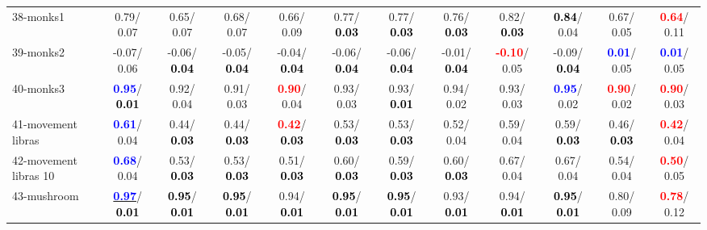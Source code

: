 \begin{table}[h]
\begin{center}
{\begin{tabular}{lc|c|c|c|c|c|c|c|c|c|c}
38-monks1 &   0.79/  0.07 &   0.65/  0.07 &   0.68/  0.07 &   0.66/  0.09 &   0.77/\textcolor{black}{\textbf{  0.03}} &   0.77/\textcolor{black}{\textbf{  0.03}} &   0.76/\textcolor{black}{\textbf{  0.03}} &   0.82/\textcolor{black}{\textbf{  0.03}} & \textcolor{black}{\textbf{  0.84}}/  0.04 &   0.67/  0.05 & \textcolor{red}{\textbf{  0.64}}/  0.11 \\
39-monks2 &  -0.07/  0.06 &  -0.06/\textcolor{black}{\textbf{  0.04}} &  -0.05/\textcolor{black}{\textbf{  0.04}} &  -0.04/\textcolor{black}{\textbf{  0.04}} &  -0.06/\textcolor{black}{\textbf{  0.04}} &  -0.06/\textcolor{black}{\textbf{  0.04}} &  -0.01/\textcolor{black}{\textbf{  0.04}} & \textcolor{red}{\textbf{ -0.10}}/  0.05 &  -0.09/\textcolor{black}{\textbf{  0.04}} & \textcolor{blue}{\textbf{  0.01}}/  0.05 & \textcolor{blue}{\textbf{  0.01}}/  0.05 \\ \hline
40-monks3 & \textcolor{blue}{\textbf{  0.95}}/\textcolor{black}{\textbf{  0.01}} &   0.92/  0.04 &   0.91/  0.03 & \textcolor{red}{\textbf{  0.90}}/  0.04 &   0.93/  0.03 &   0.93/\textcolor{black}{\textbf{  0.01}} &   0.94/  0.02 &   0.93/  0.03 & \textcolor{blue}{\textbf{  0.95}}/  0.02 & \textcolor{red}{\textbf{  0.90}}/  0.02 & \textcolor{red}{\textbf{  0.90}}/  0.03 \\
41-movement libras & \textcolor{blue}{\textbf{  0.61}}/  0.04 &   0.44/\textcolor{black}{\textbf{  0.03}} &   0.44/\textcolor{black}{\textbf{  0.03}} & \textcolor{red}{\textbf{  0.42}}/\textcolor{black}{\textbf{  0.03}} &   0.53/\textcolor{black}{\textbf{  0.03}} &   0.53/\textcolor{black}{\textbf{  0.03}} &   0.52/  0.04 &   0.59/  0.04 &   0.59/\textcolor{black}{\textbf{  0.03}} &   0.46/\textcolor{black}{\textbf{  0.03}} & \textcolor{red}{\textbf{  0.42}}/  0.04 \\
42-movement libras 10 & \textcolor{blue}{\textbf{  0.68}}/  0.04 &   0.53/\textcolor{black}{\textbf{  0.03}} &   0.53/\textcolor{black}{\textbf{  0.03}} &   0.51/\textcolor{black}{\textbf{  0.03}} &   0.60/\textcolor{black}{\textbf{  0.03}} &   0.59/\textcolor{black}{\textbf{  0.03}} &   0.60/\textcolor{black}{\textbf{  0.03}} &   0.67/  0.04 &   0.67/  0.04 &   0.54/  0.04 & \textcolor{red}{\textbf{  0.50}}/  0.05 \\
43-mushroom & \underline{\textcolor{blue}{\textbf{  0.97}}}/\textcolor{black}{\textbf{  0.01}} & \textcolor{black}{\textbf{  0.95}}/\textcolor{black}{\textbf{  0.01}} & \textcolor{black}{\textbf{  0.95}}/\textcolor{black}{\textbf{  0.01}} &   0.94/\textcolor{black}{\textbf{  0.01}} & \textcolor{black}{\textbf{  0.95}}/\textcolor{black}{\textbf{  0.01}} & \textcolor{black}{\textbf{  0.95}}/\textcolor{black}{\textbf{  0.01}} &   0.93/\textcolor{black}{\textbf{  0.01}} &   0.94/\textcolor{black}{\textbf{  0.01}} & \textcolor{black}{\textbf{  0.95}}/\textcolor{black}{\textbf{  0.01}} &   0.80/  0.09 & \textcolor{red}{\textbf{  0.78}}/  0.12 \\

\end{tabular}}
\end{center}
\end{table}

